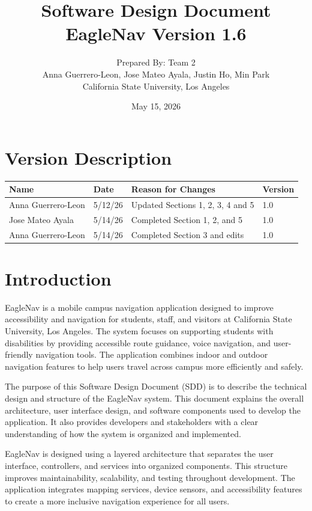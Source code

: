 \documentclass[12pt]{article}
\title{\textbf{Software Design Document} \\ EagleNav Version 1.6}
\author{Prepared By: Team 2 \\
Anna Guerrero-Leon, Jose Mateo Ayala, Justin Ho, Min Park \\
California State University, Los Angeles}
\date{May 15, 2026}
\begin{document}
\maketitle
\newpage

\tableofcontents
\newpage

\section*{Version Description}
\begin{tabularx}{\textwidth}{|l|l|X|l|}
\hline
\textbf{Name} & \textbf{Date} & \textbf{Reason for Changes} & \textbf{Version} \\
\hline
Anna Guerrero-Leon & 5/12/26 & Updated Sections 1, 2, 3, 4 and 5 & 1.0 \\
\hline
Jose Mateo Ayala & 5/14/26 & Completed Section 1, 2, and 5 & 1.0 \\
\hline
Anna Guerrero-Leon & 5/14/26 & Completed Section 3 and edits & 1.0 \\
\hline
\end{tabularx}

\newpage

\section{Introduction}

EagleNav is a mobile campus navigation application designed to improve accessibility and navigation for students, staff, and visitors at California State University, Los Angeles. The system focuses on supporting students with disabilities by providing accessible route guidance, voice navigation, and user-friendly navigation tools. The application combines indoor and outdoor navigation features to help users travel across campus more efficiently and safely.

The purpose of this Software Design Document (SDD) is to describe the technical design and structure of the EagleNav system. This document explains the overall architecture, user interface design, and software components used to develop the application. It also provides developers and stakeholders with a clear understanding of how the system is organized and implemented.

EagleNav is designed using a layered architecture that separates the user interface, controllers, and services into organized components. This structure improves maintainability, scalability, and testing throughout development. The application integrates mapping services, device sensors, and accessibility features to create a more inclusive navigation experience for all users.
\end{document}
